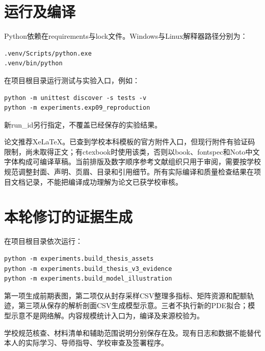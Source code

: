 \section{运行及编译}
Python依赖在requirements与lock文件。Windows与Linux解释器路径分别为：
\begin{verbatim}
.venv/Scripts/python.exe
.venv/bin/python
\end{verbatim}
在项目根目录运行测试与实验入口，例如：
\begin{verbatim}
python -m unittest discover -s tests -v
python -m experiments.exp09_reproduction
\end{verbatim}
新run\_id另行指定，不覆盖已经保存的实验结果。

论文推荐XeLaTeX。已查到学校本科模板的官方附件入口，但现行附件有验证码限制，尚未取得正文；有ctexbook时使用该类，否则以book、fontspec和Noto中文字体构成可编译草稿。当前排版及数字顺序参考文献组织只用于审阅，需要按学校规范调整封面、声明、页眉、目录和引用细节。所有实际编译和质量检查结果在项目文档记录，不能把编译成功理解为论文已获学校审核。

\section{本轮修订的证据生成}
在项目根目录依次运行：
\begin{verbatim}
python -m experiments.build_thesis_assets
python -m experiments.build_thesis_v3_evidence
python -m experiments.build_model_illustration
\end{verbatim}
第一项生成前期表图，第二项仅从封存采样CSV整理多指标、矩阵资源和配额轨迹，第三项从保存的解析剖面CSV生成模型示意。三者不执行新的PDE拟合；模型示意不是网络解。内容规模统计入口为，编译及来源校验为。

学校规范核查、材料清单和辅助范围说明分别保存在及。现有日志和数据不能替代本人的实际学习、导师指导、学校审查及签署程序。

